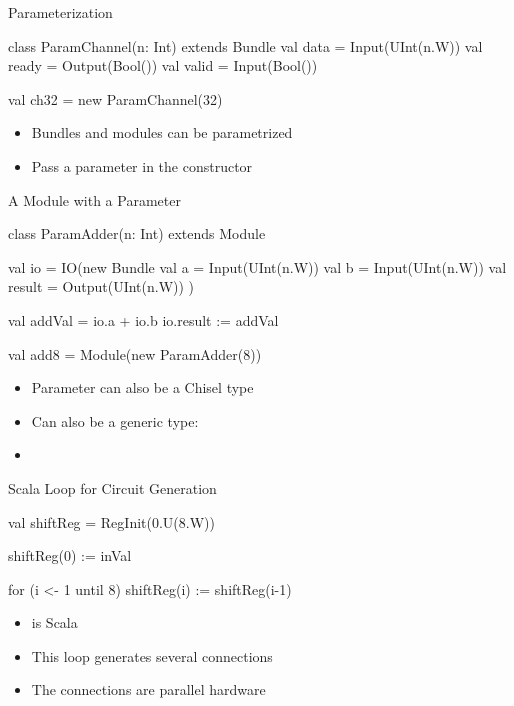 \begin{frame}[fragile]{Parameterization}
\begin{chisel}
class ParamChannel(n: Int) extends Bundle {
  val data = Input(UInt(n.W))
  val ready = Output(Bool())
  val valid = Input(Bool())
}

val ch32 = new ParamChannel(32)
\end{chisel}
\begin{itemize}
\item Bundles and modules can be parametrized
\item Pass a parameter in the constructor
\end{itemize}

\end{frame}
\begin{frame}[fragile]{A Module with a Parameter}
\begin{chisel}
class ParamAdder(n: Int) extends Module {
  val io = IO(new Bundle {
    val a = Input(UInt(n.W))
    val b = Input(UInt(n.W))
    val result = Output(UInt(n.W))
  })

  val addVal = io.a + io.b
  io.result := addVal
}

val add8 = Module(new ParamAdder(8))
\end{chisel}
\begin{itemize}
\item Parameter can also be a Chisel type
\item Can also be a generic type:
\item {}
\end{itemize}
\end{frame}

\begin{frame}[fragile]{Scala  Loop for Circuit Generation}
\begin{chisel}
val shiftReg = RegInit(0.U(8.W))

shiftReg(0) := inVal

for (i <- 1 until 8) {
  shiftReg(i) := shiftReg(i-1)
}
\end{chisel}
\begin{itemize}
\item {} is Scala
\item This loop generates several connections
\item The connections are parallel hardware
\end{itemize}
\end{frame}


